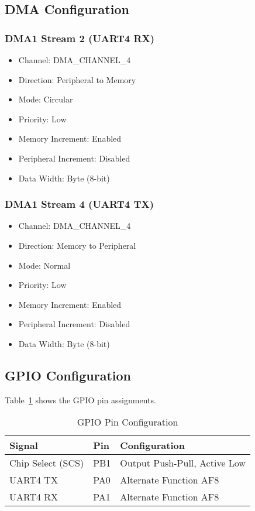 \documentclass[11pt,a4paper]{article}
\begin{document}
\subsection{DMA Configuration}

\subsubsection{DMA1 Stream 2 (UART4 RX)}

\begin{itemize}[noitemsep]
    \item Channel: DMA\_CHANNEL\_4
    \item Direction: Peripheral to Memory
    \item Mode: Circular
    \item Priority: Low
    \item Memory Increment: Enabled
    \item Peripheral Increment: Disabled
    \item Data Width: Byte (8-bit)
\end{itemize}

\subsubsection{DMA1 Stream 4 (UART4 TX)}

\begin{itemize}[noitemsep]
    \item Channel: DMA\_CHANNEL\_4
    \item Direction: Memory to Peripheral
    \item Mode: Normal
    \item Priority: Low
    \item Memory Increment: Enabled
    \item Peripheral Increment: Disabled
    \item Data Width: Byte (8-bit)
\end{itemize}

\subsection{GPIO Configuration}

Table~\ref{tab:gpio_config} shows the GPIO pin assignments.

\begin{table}[H]
\centering
\begin{tabular}{lll}
\toprule
\textbf{Signal} & \textbf{Pin} & \textbf{Configuration} \\
\midrule
Chip Select (SCS) & PB1 & Output Push-Pull, Active Low \\
UART4 TX & PA0 & Alternate Function AF8 \\
UART4 RX & PA1 & Alternate Function AF8 \\
\bottomrule
\end{tabular}
\caption{GPIO Pin Configuration}
\label{tab:gpio_config}
\end{table}
\end{document}
